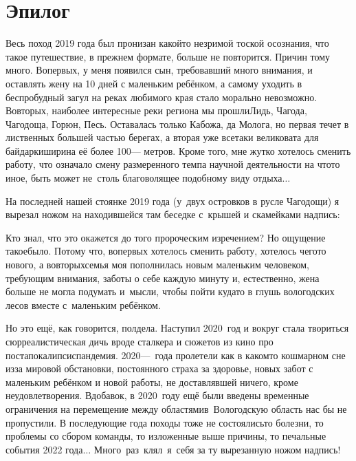 {
\cleardoublepage
{}

\fancyhead[LE]{\fancyplain{}{}}
\fancyhead[RO]{\fancyplain{}{}}

\section*{Эпилог}
Весь поход 2019 года был пронизан какой\sdash то незримой тоской осознания, что такое путешествие, в прежнем формате, больше не повторится. Причин тому много. Во\sdash первых, у меня появился сын, требовавший много внимания, и оставлять жену на 10 дней с маленьким ребёнком, а самому уходить в беспробудный загул на реках любимого края стало морально невозможно. Во\sdash вторых, наиболее интересные реки региона мы прошли\mdash Лидь, Чагода, Чагодоща, Горюн, Песь. Оставалась только Кабожа, да Молога, но первая течет в лиственных большей частью берегах, а вторая уже все\sdash таки великовата для байдарки\mdash ширина её более 100\thinspace\nobreakdash--- метров. Кроме того, мне жутко хотелось сменить работу, что означало смену размеренного темпа научной деятельности на что\sdash то иное, быть может не~столь благоволящее подобному виду отдыха$\ldots$ 

На последней нашей стоянке 2019 года (у~двух островков в русле Чагодощи) я вырезал ножом на находившейся там беседке с~крышей и скамейками надпись:

{\centering\Large{}}

Кто знал, что это окажется до того пророческим изречением? Но ощущение такое\mdash было. Потому что, во\sdash первых хотелось сменить работу, хотелось чего\sdash то нового, а во\sdash вторых\mdash семья моя пополнилась новым маленьким человеком, требующим внимания, заботы о себе каждую минуту и, естественно, жена больше не могла подумать и~мысли, чтобы пойти куда\sdash то в глушь вологодских лесов вместе с~маленьким ребёнком.

Но это ещё, как говорится, полдела. Наступил 2020~год и вокруг стала твориться сюрреалистическая дичь вроде сталкера и сюжетов из кино про постапокалипсис\mdash пандемия. 2020\thinspace\nobreakdash---~года пролетели как в каком\sdash то кошмарном сне из\sdash за мировой обстановки, постоянного страха за здоровье, новых забот с маленьким ребёнком и новой работы, не доставлявшей ничего, кроме неудовлетворения. Вдобавок, в 2020~году ещё были введены временные ограничения на перемещение между областями\mdash в~Вологодскую область нас бы не пропустили. В последующие года походы тоже не состоялись\mdash то болезни, то проблемы со сбором команды, то изложенные выше причины, то печальные события 2022 года$\ldots$ Много~раз~клял~я~себя за ту вырезанную ножом надпись!

}
